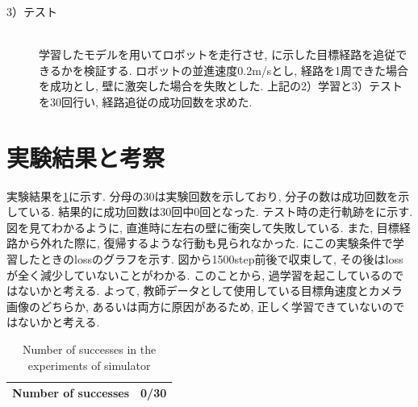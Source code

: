 \begin{description}
  \item[3）テスト]\mbox{}\\ \hspace*{3mm}学習したモデルを用いてロボットを走行させ, に示した目標経路を追従できるかを検証する. ロボットの並進速度0.2m/sとし, 経路を1周できた場合を成功とし, 壁に激突した場合を失敗とした. 上記の2）学習と3）テストを30回行い, 経路追従の成功回数を求めた. 
\end{description}

\section{実験結果と考察}
実験結果を\ref{tb:exp2}に示す. 分母の30は実験回数を示しており, 分子の数は成功回数を示している. 結果的に成功回数は30回中0回となった. テスト時の走行軌跡をに示す. 図を見てわかるように, 直進時に左右の壁に衝突して失敗している. また, 目標経路から外れた際に, 復帰するような行動も見られなかった. にこの実験条件で学習したときのlossのグラフを示す. 図から1500step前後で収束して, その後はlossが全く減少していないことがわかる. このことから, 過学習を起こしているのではないかと考える. よって, 教師データとして使用している目標角速度とカメラ画像のどちらか, あるいは両方に原因があるため, 正しく学習できていないのではないかと考える. 

\begin{table}[h]
  \centering
  \caption{Number of successes in the experiments of simulator}
  \begin{tabular}{|c|c|} \hline
      Number of successes & 0/30 \\ \hline
    \end{tabular}
  \label{tb:exp2}
\end{table}



